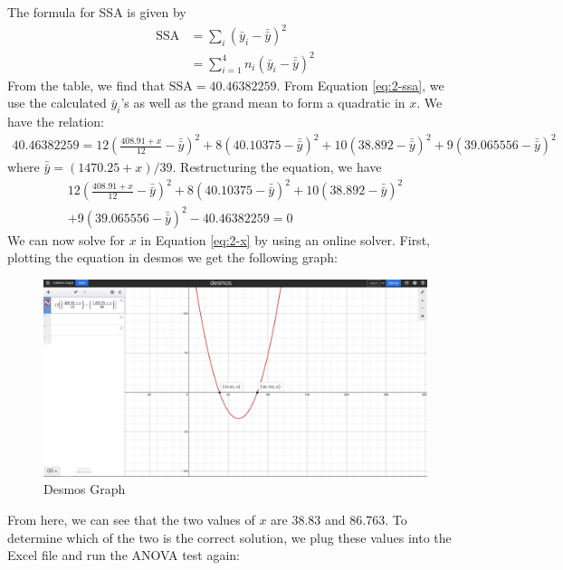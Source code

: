 \documentclass[12pt]{article}
\begin{document}
\noindent The formula for SSA is given by \begin{align} \nonumber
    \text{SSA} &= \sum_{i} (\bar{y}_i - \bar{\bar{y}})^{2} \\ \label{eq:2-ssa}
    &= \sum_{i=1}^{4} n_i (\bar{y}_i - \bar{\bar{y}})^{2}
\end{align} From the table, we find that $\text{SSA} = 40.46382259$. From Equation \ref{eq:2-ssa}, we use the calculated $\bar{y}_i$'s as well as the grand mean to form a quadratic in $x$. We have the relation: \begin{align*}
    40.46382259 = 12 \left( \frac{408.91 + x }{12} - \bar{\bar{y}} \right)^{2} + 8\left( 40.10375 - \bar{\bar{y}} \right)^{2} + 10\left( 38.892 - \bar{\bar{y}} \right)^{2} + 9\left( 39.065556 - \bar{\bar{y}} \right)^{2}
\end{align*} where $\bar{\bar{y}} = (1470.25 + x) / 39$. Restructuring the equation, we have \begin{align} \nonumber
    12 \left( \frac{408.91 + x }{12} - \bar{\bar{y}} \right)^{2} + 8\left( 40.10375 - \bar{\bar{y}} \right)^{2} + 10\left( 38.892 - \bar{\bar{y}} \right)^{2}  \\ \label{eq:2-x}
    + 9\left( 39.065556 - \bar{\bar{y}} \right)^{2} - 40.46382259 = 0 
\end{align} We can now solve for $x$ in Equation \ref{eq:2-x} by using an online solver. First, plotting the equation in desmos we get the following graph: 

\begin{figure}[H]
    \centering
    \includegraphics[width=\textwidth]{Images/Q2Desmos.png}
    \caption{Desmos Graph}
    \label{fig:2-desmos}
\end{figure} From here, we can see that the two values of $x$ are 38.83 and 86.763. To determine which of the two is the correct solution, we plug these values into the Excel file and run the ANOVA test again: 
\end{document}
